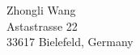 \documentclass[11pt]{article}
\begin{document}
    
    













\begin{flushright}
Zhongli Wang \\
Astastrasse 22 \\
33617 Bielefeld, Germany
\end{flushright}
\end{document}
